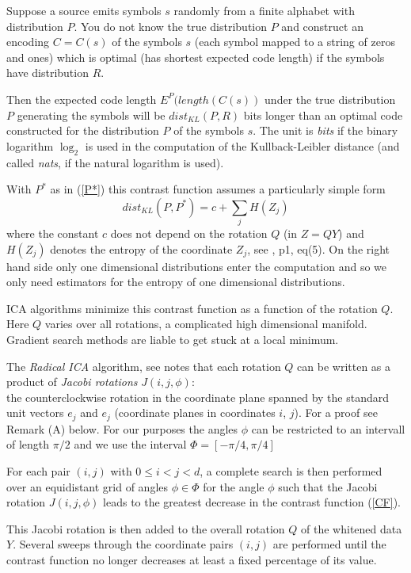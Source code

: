 \documentclass[
10pt,
fleqn,
nosumlimits,
nointlimits,
nonamelimits
]
{article}
\begin{document}
Suppose a source emits symbols $s$ randomly from a finite alphabet with distribution $P$.
You do not know the true distribution $P$ and construct an encoding $C=C(s)$ of the symbols $s$ 
(each symbol mapped to a string of zeros and ones)
which is optimal (has shortest expected code length) if the symbols have distribution $R$.

Then the expected code length $E^P(length(C(s))$ under the true distribution $P$ generating the symbols
will be $dist_{KL}(P,R)$ bits longer than an optimal code constructed
for the distribution $P$ of the symbols $s$. The unit is \textit{bits} if the binary logarithm $\log_2$ is used in
the computation of the Kullback-Leibler distance (and called \textit{nats}, if the natural logarithm is used).

\noindent
With $P^*$ as in (\ref{P*}) this contrast function assumes a particularly simple form
%
\begin{equation}
\label{CF}
dist_{KL}(P,P^*) = c + \sum_j H(Z_j)
\end{equation}
%
where the constant $c$ does not depend on the rotation $Q$ (in $Z=QY$) and $H(Z_j)$ denotes the entropy of the
coordinate $Z_j$, see \cite{MilFish}, p1, eq(5). On the right hand side only one dimensional distributions enter the 
computation and so we only need estimators for the entropy of one dimensional distributions.

ICA algorithms minimize this contrast function as a function of the rotation $Q$. Here $Q$ varies over all
rotations, a complicated high dimensional manifold. Gradient search methods are liable to get stuck at a
local minimum.

The \textit{Radical ICA} algorithm, see \cite{MilFish} notes that each rotation
$Q$ can be written as a product of \textit{Jacobi rotations} $J(i,j,\phi)$:\\
the counterclockwise rotation in the coordinate plane spanned by the standard unit vectors $e_j$ and $e_j$ 
(coordinate planes in coordinates $i$, $j$). For a proof see Remark (A) below.
For our purposes the angles $\phi$ can be restricted to an intervall of length $\pi/2$ and we use the interval 
$\Phi=[-\pi/4,\pi/4]$

For each pair $(i,j)$ with $0\leq i<j<d$, a complete search is then performed over an equidistant grid
of angles $\phi\in\Phi$ for the angle $\phi$ such that the Jacobi rotation $J(i,j,\phi)$ leads to the greatest
decrease in the contrast function (\ref{CF}). 

This Jacobi rotation is then added to the overall rotation $Q$
of the whitened data $Y$. Several sweeps through the coordinate pairs $(i,j)$ are performed until the contrast
function no longer decreases at least a fixed percentage of its value.
\end{document}
